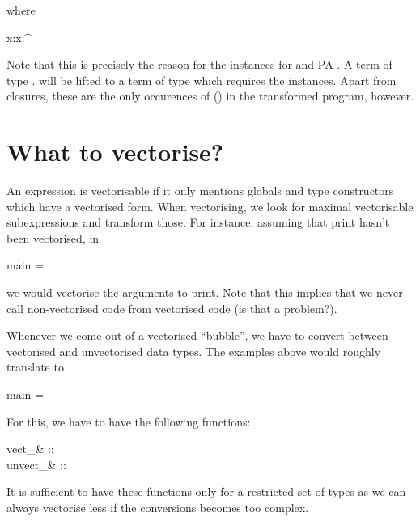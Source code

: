 \documentclass{article}
\begin{document}
where

\begin{haskell}
x:\sigma\in\Gamma \Longleftrightarrow x:\parr{\vect{\sigma}}\in\Gamma^\uparrow
\end{haskell}

Note that this is precisely the reason for the \<\parr{\cdot}\> instances for
\<\alpha\to\beta\> and \<PA \alpha\>. A term of type \<\forall\alpha.\sigma\>
will be lifted to a term of type
\<\> which requires the
instances. Apart from closures, these are the only occurences of \<({\to})\> in
the transformed program, however.


\section*{What to vectorise?}

An expression is vectorisable if it only mentions globals and type constructors
which have a vectorised form. When vectorising, we look for maximal
vectorisable subexpressions and transform those. For instance, assuming that
\<print\> hasn't been vectorised, in

\begin{haskell}
main = 
\end{haskell}

we would vectorise the arguments to \<print\>.  Note that this implies that we
never call non-vectorised code from vectorised code (is that a problem?).

Whenever we come out of a vectorised ``bubble'', we have to convert between
vectorised and unvectorised data types. The examples above would roughly
translate to

\begin{haskell}
main = 
\end{haskell}

For this, we have to have the following functions:

\begin{haskell}
vect_\sigma & :: \sigma\to\vect{\sigma} \\
unvect_\sigma & :: \vect{\sigma}\to\sigma
\end{haskell}

It is sufficient to have these functions only for a restricted set of types as
we can always vectorise less if the conversions becomes too complex.
\end{document}
